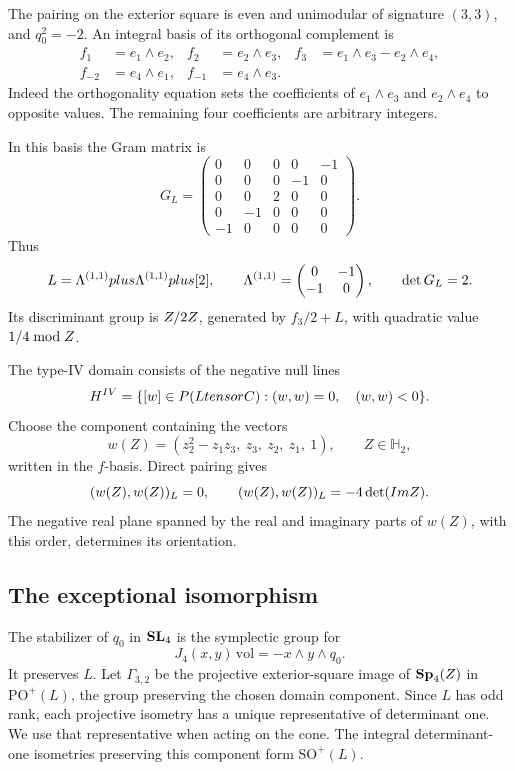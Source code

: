 The pairing on the exterior square is even and unimodular of
signature \((3,3)\), and \(q_0^2=-2\).
An integral basis of its orthogonal complement is
\[
\begin{aligned}
 f_1&=e_1\wedge e_2,&
 f_2&=e_2\wedge e_3,&
 f_3&=e_1\wedge e_3-e_2\wedge e_4,\\
 f_{-2}&=e_4\wedge e_1,&
 f_{-1}&=e_4\wedge e_3.
\end{aligned}
\]
Indeed the orthogonality equation sets the coefficients of
\(e_1\wedge e_3\) and \(e_2\wedge e_4\) to opposite values.
The remaining four coefficients are arbitrary integers.

In this basis the Gram matrix is
\[
 G_L=
 \begin{pmatrix}
 0&0&0&0&-1\\
 0&0&0&-1&0\\
 0&0&2&0&0\\
 0&-1&0&0&0\\
 -1&0&0&0&0
 \end{pmatrix}.
\]
Thus
\[
 L=\Lambda^{(1,1)}plus\Lambda^{(1,1)}plus[2],\qquad
 \Lambda^{(1,1)}=\begin{pmatrix}0&-1\\-1&0\end{pmatrix},
 \qquad \det G_L=2.
\]
Its discriminant group is \(Z/2Z\), generated by
\(f_3/2+L\), with quadratic value \(1/4\bmod Z\).

The type-IV domain consists of the negative null lines
\[
 H^{IV}
 =\{[w]\in P(LtensorC):(w,w)=0,\quad
                                  (w,w)<0\}.
\]
Choose the component containing the vectors
\[
 w(Z)=(z_2^2-z_1z_3,\ z_3,\ z_2,\ z_1,\ 1),
 \qquad Z\in\mathbb H_2,
\]
written in the \(f\)-basis.  Direct pairing gives
\[
 (w(Z),w(Z))_L=0,\qquad
 (w(Z),w(Z))_L=-4\det(Im Z).
\]
The negative real plane spanned by the real and imaginary parts of
\(w(Z)\), with this order, determines its orientation.

\subsection{The exceptional isomorphism}
\label{ssec:exceptional-iso}

The stabilizer of \(q_0\) in \(\mathbf{SL}_4\) is the symplectic group for
\[
 J_4(x,y)\,\mathrm{vol}=-x\wedge y\wedge q_0.
\]
It preserves \(L\).
Let \(\Gamma_{3,2}\) be the projective exterior-square image
of \(\mathbf{Sp}_4(Z)\)
in \(\mathrm{PO}^+(L)\), the group preserving the chosen domain
component.  Since \(L\) has odd rank, each projective isometry has
a unique representative of determinant one.  We use that
representative when acting on the cone.
The integral determinant-one isometries preserving this component
form \(\mathrm{SO}^+(L)\).

